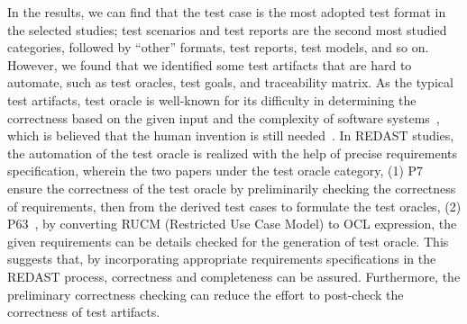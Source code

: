 In the results, we can find that the test case is the most adopted test format in the selected studies; test scenarios and test reports are the second most studied categories, followed by ``other'' formats, test reports, test models, and so on. However, we found that we identified some test artifacts that are hard to automate, such as test oracles, test goals, and traceability matrix. As the typical test artifacts, test oracle is well-known for its difficulty in determining the correctness based on the given input and the complexity of software systems~\cite{test_oracle_01, test_oracle_02, test_oracle_03}, which is believed that the human invention is still needed~\cite{test_oracle_04}. In REDAST studies, the automation of the test oracle is realized with the help of precise requirements specification, wherein the two papers under the test oracle category, (1) P7~ ensure the correctness of the test oracle by preliminarily checking the correctness of requirements, then from the derived test cases to formulate the test oracles, (2) P63~, by converting RUCM (Restricted Use Case Model) to OCL expression, the given requirements can be details checked for the generation of test oracle. This suggests that, by incorporating appropriate requirements specifications in the REDAST process, correctness and completeness can be assured. Furthermore, the preliminary correctness checking can reduce the effort to post-check the correctness of test artifacts.







% 

